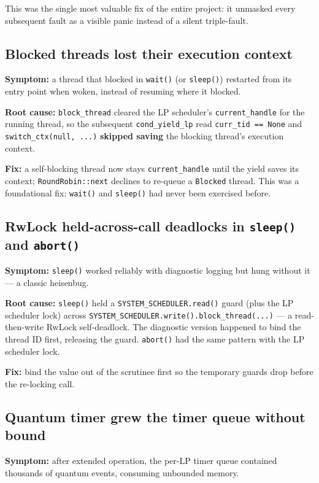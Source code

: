 This was the single most valuable fix of the entire project: it unmasked every
subsequent fault as a visible panic instead of a silent triple-fault.

\subsection{Blocked threads lost their execution context}

\textbf{Symptom:} a thread that blocked in \texttt{wait()} (or \texttt{sleep()})
restarted from its entry point when woken, instead of resuming where it
blocked.

\textbf{Root cause:} \texttt{block\_thread} cleared the LP scheduler's
\texttt{current\_handle} for the running thread, so the subsequent
\texttt{cond\_yield\_lp} read \texttt{curr\_tid == None} and
\texttt{switch\_ctx(null, ...)} \textbf{skipped saving} the blocking thread's
execution context.

\textbf{Fix:} a self-blocking thread now stays \texttt{current\_handle} until
the yield saves its context; \texttt{RoundRobin::next} declines to re-queue a
\texttt{Blocked} thread. This was a foundational fix: \texttt{wait()} and
\texttt{sleep()} had never been exercised before.

\subsection{RwLock held-across-call deadlocks in \texttt{sleep()} and
\texttt{abort()}}

\textbf{Symptom:} \texttt{sleep()} worked reliably with diagnostic logging but
hung without it --- a classic heisenbug.

\textbf{Root cause:} \texttt{sleep()} held a \texttt{SYSTEM\_SCHEDULER.read()}
guard (plus the LP scheduler lock) across
\texttt{SYSTEM\_SCHEDULER.write().block\_thread(...)} --- a read-then-write
RwLock self-deadlock. The diagnostic version happened to bind the thread ID
first, releasing the guard. \texttt{abort()} had the same pattern with the LP
scheduler lock.

\textbf{Fix:} bind the value out of the scrutinee first so the temporary
guards drop before the re-locking call.

\subsection{Quantum timer grew the timer queue without bound}

\textbf{Symptom:} after extended operation, the per-LP timer queue contained
thousands of quantum events, consuming unbounded memory.

